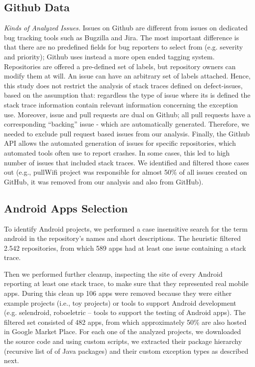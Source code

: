 \documentclass[conference]{IEEEtran}
\begin{document}
\subsection{Github Data}
\label{sec:git}

\noindent\emph{Kinds of Analyzed Issues.} Issues on Github are different from issues on dedicated bug tracking tools such as Bugzilla and Jira. The most important difference is that there are no predefined fields for bug reporters to select from (e.g. severity and priority); Github uses instead a more open
ended tagging system. Repositories are offered a pre-defined set of labels, but repository
owners can modify them at will. An issue can have an arbitrary set of labels attached. Hence, this study does not restrict the analysis of stack traces defined on defect-issues, based on the assumption that: regardless the type of issue where its is defined the stack trace information contain relevant information concerning the exception use. Moreover, issue and pull requests are dual on Github; all pull requests have a corresponding ``backing'' issue - which are automatically generated. Therefore, we needed to exclude pull request based issues from our analysis. Finally, the Github API allows the automated generation of issues for specific repositories, which automated tools often use to report crashes. In some cases, this led to high number of issues that included stack traces. We identified and filtered those cases out (e.g., pullWifi project was responsible for almost 50\% of all issues created on GitHub, it was removed from our analysis and also from GitHub).

\subsection{Android Apps Selection}
\label{sec:android}

To identify Android projects, we performed a case insensitive search for the 
term \textsf{android} in the repository's names and short descriptions.
The heuristic filtered 2.542 repositories, from which 589 apps had at least one issue containing a stack trace. 

Then we performed further cleanup, inspecting the site of every Android reporting at least one stack trace, to make sure that they represented real mobile apps. During this clean up 106 apps were removed because they were either example projects (i.e., toy projects) or tools to support Android development (e.g. selendroid, roboeletric -- tools to support the testing of Android apps). The filtered set consisted of 482 apps, from which approximately 50\% are also hosted in Google Market Place. For each one of the analyzed projects, we downloaded the source code and using custom scripts, we extracted their package hierarchy (recursive list of of Java packages) and their custom exception types as described next.
\end{document}
